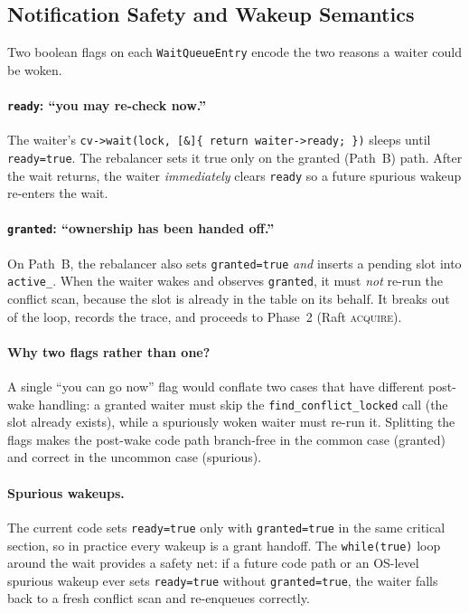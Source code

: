 \documentclass[sigconf]{acmart}
\begin{document}
\subsection{Notification Safety and Wakeup Semantics}
\label{sec:notify}

Two boolean flags on each \texttt{WaitQueueEntry} encode the two reasons
a waiter could be woken.

\paragraph{\texttt{ready}: ``you may re-check now.''}
The waiter's \texttt{cv->wait(lock, [\&]\{ return waiter->ready; \})}
sleeps until \texttt{ready=true}. The rebalancer sets it true only on
the granted (Path~B) path. After the wait returns, the waiter
\emph{immediately} clears \texttt{ready} so a future spurious wakeup
re-enters the wait.

\paragraph{\texttt{granted}: ``ownership has been handed off.''}
On Path~B, the rebalancer also sets \texttt{granted=true} \emph{and}
inserts a pending slot into \texttt{active\_}. When the waiter wakes
and observes \texttt{granted}, it must \emph{not} re-run the conflict
scan, because the slot is already in the table on its behalf. It
breaks out of the loop, records the trace, and proceeds to Phase~2
(Raft \textsc{acquire}).

\paragraph{\textbf{Why two flags rather than one?}}
A single ``you can go now'' flag would conflate two cases that have
different post-wake handling: a granted waiter must skip the
\texttt{find\_conflict\_locked} call (the slot already exists), while a
spuriously woken waiter must re-run it. Splitting the flags makes the
post-wake code path branch-free in the common case (granted) and
correct in the uncommon case (spurious).

\paragraph{\textbf{Spurious wakeups.}}
The current code sets \texttt{ready=true} only with
\texttt{granted=true} in the same critical section, so in practice every
wakeup is a grant handoff. The \texttt{while(true)} loop around the wait
provides a safety net: if a future code path or an OS-level spurious
wakeup ever sets \texttt{ready=true} without \texttt{granted=true}, the
waiter falls back to a fresh conflict scan and re-enqueues correctly.
\end{document}
